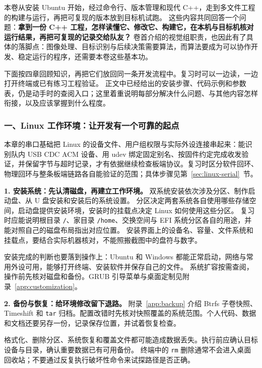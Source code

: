 \begingroup
本卷从安装 Ubuntu 开始，经过命令行、版本管理和现代 C++，走到多文件工程的构建与运行，再把可复现的版本放到目标机试跑。
这些内容共同回答一个问题：\textbf{拿到一份 C++ 工程，怎样读懂它、修改它、构建它，在本机与目标机核对运行结果，再把可复现的记录交给队友？}
卷首介绍的视觉组职责，也因此有了具体的落脚点：图像处理、目标识别与后续决策需要算法，而算法要成为可以协作开发、稳定运行的程序，还需要本卷这些基本功。

下面按四章回顾知识，再把它们放回同一条开发流程中。复习时可以一边读，一边打开终端或已有练习工程验证。
正文中已经给出的安装步骤、代码示例和参数表，仍是动手时的查阅入口；这里着重说明每部分解决什么问题、与其他内容怎样衔接，以及应该掌握到什么程度。

\subsubsection*{一、Linux 工作环境：让开发有一个可靠的起点}

本章的串口基础把 Linux 的设备文件、用户组权限与实际外设连接串起来：能识别队内 USB CDC ACM 设备、用 udev 绑定固定别名、按固件约定完成收发验证，并保留字节与超时记录，才有依据继续检查板端协议。复习时区分软件回环、物理回环与整条板端链路各自能验证的范围；具体步骤见第~\ref{sec:linux-serial}~节。

\textbf{1. 安装系统：先认清磁盘，再建立工作环境。}
双系统安装依次涉及分区、制作启动盘、从 U 盘安装和安装后的系统设置。
分区决定两套系统各自使用哪些存储空间，启动盘提供安装环境，安装时的挂载点决定 Linux 如何使用这些分区。
复习时应能说明根目录 \texttt{/}、家目录 \texttt{/home}、交换空间与 EFI 系统分区各自的用途，并能对照自己的磁盘布局指出对应位置。
安装界面上的设备名、容量、文件系统和挂载点，要结合实际机器核对，不能照搬截图中的盘符与数字。

安装完成的判断也要落到操作上：Ubuntu 和 Windows 都能正常启动，网络与常用外设可用，能够打开终端、安装软件并保存自己的文件。
系统扩容按需查阅，操作前先核对磁盘和备份。GRUB 引导菜单与桌面定制见附录~\ref{app:customization}。

\textbf{2. 备份与恢复：给环境修改留下退路。}
附录~\ref{app:backup} 介绍 Btrfs 子卷快照、Timeshift 和 \texttt{tar} 归档。配置改错时先核对快照覆盖的系统范围。个人代码、数据和文档还要另存一份，记录保存位置，并试着恢复检查。

\begin{note}
格式化、删除分区、系统恢复和覆盖文件都可能造成数据丢失。执行前应确认目标设备与目录，确认重要数据已有可用备份。
终端中的 \texttt{rm} 删除通常不会进入桌面回收站；不要通过反复执行破坏性命令来试探路径是否正确。
\end{note}

